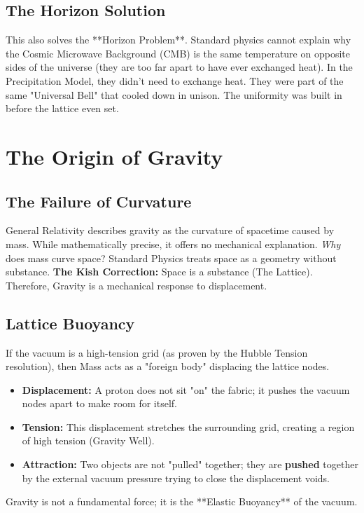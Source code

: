 \documentclass[11pt, letterpaper, openany]{book}
\begin{document}
\section{The Horizon Solution}
This also solves the **Horizon Problem**. Standard physics cannot explain why the Cosmic Microwave Background (CMB) is the same temperature on opposite sides of the universe (they are too far apart to have ever exchanged heat).
In the Precipitation Model, they didn't need to exchange heat. They were part of the same "Universal Bell" that cooled down in unison. The uniformity was built in before the lattice even set.

\chapter{The Origin of Gravity}
\label{chap:origin_of_gravity}

\section{The Failure of Curvature}
General Relativity describes gravity as the curvature of spacetime caused by mass. While mathematically precise, it offers no mechanical explanation. \textit{Why} does mass curve space?
Standard Physics treats space as a geometry without substance.
\textbf{The Kish Correction:} Space is a substance (The Lattice). Therefore, Gravity is a mechanical response to displacement.

\section{Lattice Buoyancy}
If the vacuum is a high-tension grid (as proven by the Hubble Tension resolution), then Mass acts as a "foreign body" displacing the lattice nodes.
\begin{itemize}
    \item \textbf{Displacement:} A proton does not sit "on" the fabric; it pushes the vacuum nodes apart to make room for itself.
    \item \textbf{Tension:} This displacement stretches the surrounding grid, creating a region of high tension (Gravity Well).
    \item \textbf{Attraction:} Two objects are not "pulled" together; they are \textbf{pushed} together by the external vacuum pressure trying to close the displacement voids.
\end{itemize}
Gravity is not a fundamental force; it is the **Elastic Buoyancy** of the vacuum.
\end{document}
